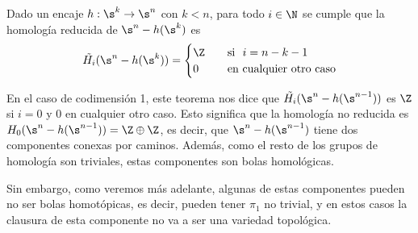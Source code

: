     \begin{teo}
    Dado un encaje $h:\s^k\to \s^n$ con $k<n$, para todo $i\in\N$ se cumple que la homología reducida de $\s^n - h(\s^k)$ es $$\tilde{H_i}(\s^n - h(\s^k))=
    \begin{cases}
    \Z\quad &\text{si }\,\, i=n-k-1\\
    0\quad &\text{en cualquier otro caso}
    \end{cases}$$
    \end{teo}

    \begin{obs}
    En el caso de codimensión 1, este teorema nos dice que $\tilde{H_i}(\s^n-h(\s^{n-1}))$ es $\Z$ si $i=0$ y $0$ en cualquier otro caso. Esto significa que la homología no reducida es $H_0(\s^n-h(\s^{n-1}))=\Z\oplus\Z$, es decir, que $\s^n-h(\s^{n-1})$ tiene dos componentes conexas por caminos. Además, como el resto de los grupos de homología son triviales, estas componentes son bolas homológicas. 
    
    Sin embargo, como veremos más adelante, algunas de estas componentes pueden no ser bolas homotópicas, es decir, pueden tener $\pi_1$ no trivial, y en estos casos la clausura de esta componente no va a ser una variedad topológica.
    \end{obs}

